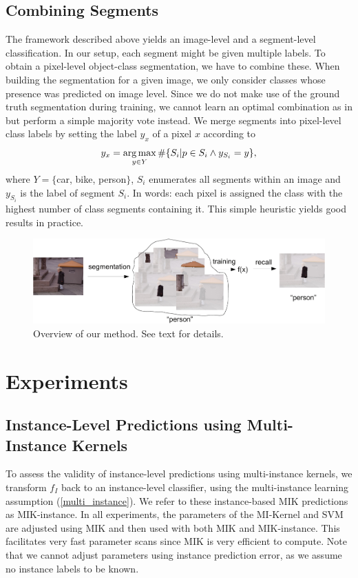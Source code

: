 \subsection{Combining Segments}
The framework described above yields an image-level and a segment-level classification.
In our setup, each segment might be given multiple labels. To obtain a pixel-level object-class segmentation, we have to combine these. 
When building the segmentation for a given image, we only consider classes whose presence was predicted on image level.
Since we do not make use of the ground truth segmentation during training, we cannot learn an optimal combination as 
in \citet{li2010object} but perform a simple majority vote instead.
We merge segments into pixel-level class labels by setting
the label $y_x$ of a pixel $x$ according to
\begin{equation}
    y_x = \operatorname*{arg\,max}_{y \in Y} \#\{S_i | p \in S_i \land y_{S_i}=y \},
\end{equation}
where $Y= \{$car, bike, person$ \}$, $S_i$ enumerates all segments within an
image and $y_{S_i}$ is the label of segment $S_i$. In words: each pixel is
assigned the class with the highest number of class segments containing it.
This simple heuristic yields good results in practice.

\begin{figure}[tbp]
	\begin{center}
        \includegraphics[width=\linewidth]{images/scheme-crop.pdf}
	\end{center}
        \caption{Overview of our method. See text for details.}
\end{figure}
\section{Experiments}
\subsection{Instance-Level Predictions using Multi-Instance Kernels}
To assess the validity of instance-level predictions using multi-instance kernels, we transform $f_{I}$
back to an instance-level classifier, using the multi-instance learning
assumption (\eqref{multi_instance}). We refer to these instance-based MIK predictions
as MIK-instance. In all experiments, the parameters of the MI-Kernel
and SVM are adjusted using MIK and then used with both MIK and MIK-instance.
This facilitates very fast parameter scans since MIK is very efficient to
compute. Note that we cannot adjust parameters using instance prediction error, as we assume
no instance labels to be known.

